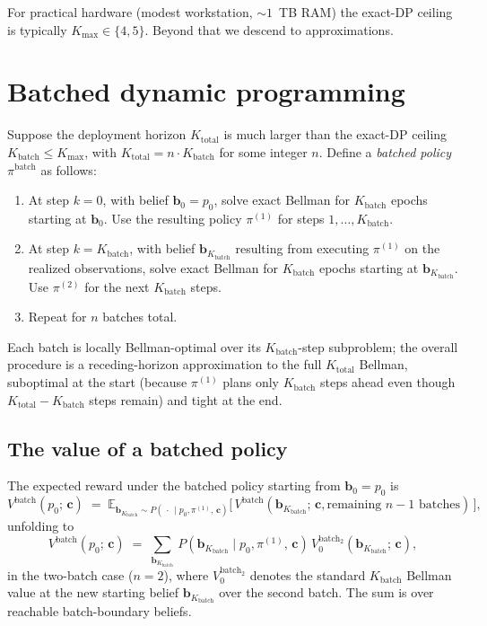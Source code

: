 \documentclass[11pt,a4paper]{article}
\newcommand{\bc}{\bm{c}}
\newcommand{\bb}{\bm{b}}
\newcommand{\E}{\mathbb{E}}
\begin{document}
For practical hardware (modest workstation, $\sim 1$~TB RAM) the exact-DP ceiling is
typically $K_\mathrm{max} \in \{4, 5\}$.  Beyond that we descend to approximations.

\section{Batched dynamic programming}
\label{sec:batched}

Suppose the deployment horizon $K_\mathrm{total}$ is much larger than the exact-DP ceiling
$K_\mathrm{batch} \le K_\mathrm{max}$, with $K_\mathrm{total} = n \cdot K_\mathrm{batch}$
for some integer $n$.  Define a \emph{batched policy} $\pi^\mathrm{batch}$ as follows:

\begin{enumerate}[nosep, leftmargin=2em]
\item At step $k = 0$, with belief $\bb_0 = p_0$, solve exact Bellman for $K_\mathrm{batch}$
      epochs starting at $\bb_0$.  Use the resulting policy $\pi^{(1)}$ for steps $1, \ldots, K_\mathrm{batch}$.
\item At step $k = K_\mathrm{batch}$, with belief $\bb_{K_\mathrm{batch}}$ resulting from
      executing $\pi^{(1)}$ on the realized observations, solve exact Bellman for $K_\mathrm{batch}$
      epochs starting at $\bb_{K_\mathrm{batch}}$.  Use $\pi^{(2)}$ for the next $K_\mathrm{batch}$ steps.
\item Repeat for $n$ batches total.
\end{enumerate}

Each batch is locally Bellman-optimal over its $K_\mathrm{batch}$-step subproblem; the
overall procedure is a receding-horizon approximation to the full $K_\mathrm{total}$
Bellman, suboptimal at the start (because $\pi^{(1)}$ plans only $K_\mathrm{batch}$ steps
ahead even though $K_\mathrm{total} - K_\mathrm{batch}$ steps remain) and tight at the end.

\subsection{The value of a batched policy}

The expected reward under the batched policy starting from $\bb_0 = p_0$ is
\begin{equation}
V^\mathrm{batch}(p_0;\, \bc)
\;=\;
\E_{\bb_{K_\mathrm{batch}} \sim P(\,\cdot\,\mid p_0, \pi^{(1)},\, \bc)}\!
\bigl[\,V^\mathrm{batch}(\bb_{K_\mathrm{batch}};\, \bc, \text{remaining } n - 1 \text{ batches})\,\bigr],
\label{eq:Vbatch_recursive}
\end{equation}
unfolding to
\begin{equation}
V^\mathrm{batch}(p_0;\, \bc)
\;=\;
\sum_{\bb_{K_\mathrm{batch}}}\, P(\bb_{K_\mathrm{batch}} \mid p_0, \pi^{(1)},\, \bc)\,
V_0^{\mathrm{batch}_2}(\bb_{K_\mathrm{batch}};\, \bc),
\label{eq:Vbatch_2batch}
\end{equation}
in the two-batch case ($n = 2$), where $V_0^{\mathrm{batch}_2}$ denotes the standard
$K_\mathrm{batch}$ Bellman value at the new starting belief $\bb_{K_\mathrm{batch}}$ over
the second batch.  The sum is over reachable batch-boundary beliefs.
\end{document}
